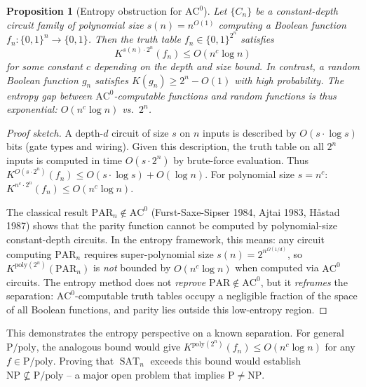 \documentclass[aps,prd,twocolumn,superscriptaddress,nofootinbib]{revtex4-2}
\newtheorem{proposition}[theorem]{Proposition}
\theoremstyle{definition}
\theoremstyle{remark}
\DeclareMathOperator{\SAT}{SAT}
\newcommand{\NP}{\mathrm{NP}}
\newcommand{\PP}{\mathrm{P}}
\begin{document}
\begin{proposition}[Entropy obstruction for $\mathrm{AC}^0$]
\label{prop:ac0}
Let $\{C_n\}$ be a constant-depth circuit family of polynomial size $s(n) = n^{O(1)}$ computing a Boolean function $f_n: \{0,1\}^n \to \{0,1\}$. Then the truth table $f_n \in \{0,1\}^{2^n}$ satisfies
\begin{equation}
K^{s(n) \cdot 2^n}(f_n) \leq O(n^c \log n)
\end{equation}
for some constant $c$ depending on the depth and size bound. In contrast, a \textit{random} Boolean function $g_n$ satisfies $K(g_n) \geq 2^n - O(1)$ with high probability. The entropy gap between $\mathrm{AC}^0$-computable functions and random functions is thus exponential: $O(n^c \log n)$ vs.\ $2^n$.
\end{proposition}

\begin{proof}[Proof sketch]
A depth-$d$ circuit of size $s$ on $n$ inputs is described by $O(s \cdot \log s)$ bits (gate types and wiring). Given this description, the truth table on all $2^n$ inputs is computed in time $O(s \cdot 2^n)$ by brute-force evaluation. Thus $K^{O(s \cdot 2^n)}(f_n) \leq O(s \cdot \log s) + O(\log n)$. For polynomial size $s = n^c$: $K^{n^c \cdot 2^n}(f_n) \leq O(n^c \log n)$.

The classical result $\mathrm{PAR}_n \notin \mathrm{AC}^0$ (Furst-Saxe-Sipser 1984, Ajtai 1983, H\r{a}stad 1987) shows that the parity function cannot be computed by polynomial-size constant-depth circuits. In the entropy framework, this means: any circuit computing $\mathrm{PAR}_n$ requires super-polynomial size $s(n) = 2^{n^{\Omega(1/d)}}$, so $K^{\mathrm{poly}(2^n)}(\mathrm{PAR}_n)$ is \textit{not} bounded by $O(n^c \log n)$ when computed via $\mathrm{AC}^0$ circuits. The entropy method does not \textit{reprove} $\mathrm{PAR} \notin \mathrm{AC}^0$, but it \textit{reframes} the separation: $\mathrm{AC}^0$-computable truth tables occupy a negligible fraction of the space of all Boolean functions, and parity lies outside this low-entropy region.
\end{proof}

This demonstrates the entropy perspective on a known separation. For general $\PP/\mathrm{poly}$, the analogous bound would give $K^{\mathrm{poly}(2^n)}(f_n) \leq O(n^c \log n)$ for any $f \in \PP/\mathrm{poly}$. Proving that $\SAT_n$ exceeds this bound would establish $\NP \not\subseteq \PP/\mathrm{poly}$ -- a major open problem that implies $\PP \neq \NP$.
\end{document}
